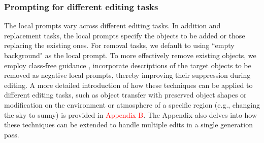 \documentclass{article}
\begin{document}
\subsubsection{Prompting for different editing tasks}

The local prompts vary across different editing tasks. In addition and replacement tasks, the local prompts specify the objects to be added or those replacing the existing ones. For removal tasks, we default to using ``empty background" as the local prompt. To more effectively remove existing objects, we employ class-free guidance \citep{ho2022classifier}, incorporate descriptions of the target objects to be removed as negative local prompts, thereby improving their suppression during editing. A more detailed introduction of how these techniques can be applied to different editing tasks, such as object transfer with preserved object shapes or modification on the environment or atmosphere of a specific region (e.g., changing the sky to sunny) is provided in \textcolor{red}{Appendix B}. The Appendix also delves into how these techniques can be extended to handle multiple edits in a single generation pass.




\end{document}
